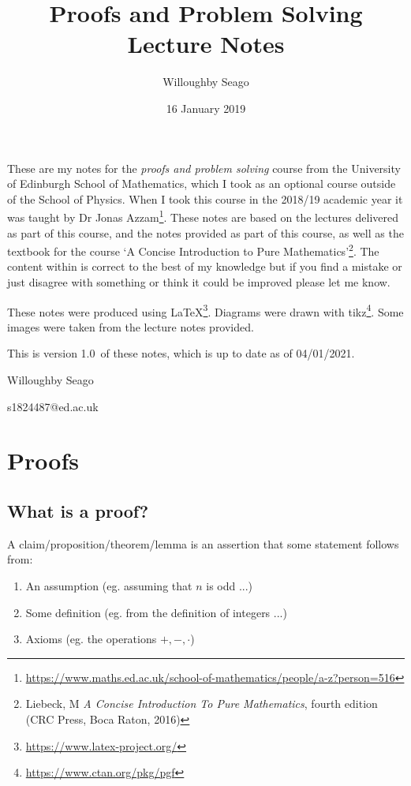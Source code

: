 \documentclass{article}
\title{Proofs and Problem Solving Lecture Notes}
\author{Willoughby Seago}
\date{16 January 2019}
\newcommand{\notesVersion}{1.0}
\newcommand{\notesDate}{04/01/2021}
\begin{document}
\maketitle
These are my notes for the \textit{proofs and problem solving} course from the University of Edinburgh School of Mathematics, which I took as an optional course outside of the School of Physics.
When I took this course in the 2018/19 academic year it was taught by Dr Jonas Azzam\footnote{\url{https://www.maths.ed.ac.uk/school-of-mathematics/people/a-z?person=516}}.
These notes are based on the lectures delivered as part of this course, and the notes provided as part of this course, as well as the textbook for the course `A Concise Introduction to Pure Mathematics'\footnote{Liebeck, M \textit{A Concise Introduction To Pure Mathematics}, fourth edition (CRC Press, Boca Raton, 2016)}.
The content within is correct to the best of my knowledge but if you find a mistake or just disagree with something or think it could be improved please let me know.

These notes were produced using \LaTeX\footnote{\url{https://www.latex-project.org/}}.
Diagrams were drawn with tikz\footnote{\url{https://www.ctan.org/pkg/pgf}}.
Some images were taken from the lecture notes provided.

This is version \notesVersion~of these notes, which is up to date as of \notesDate.
\begin{flushright}
    Willoughby Seago
    
    s1824487@ed.ac.uk
\end{flushright}
\clearpage

\tableofcontents
\newpage
\section{Proofs}

\subsection*{What is a proof?}

A claim/proposition/theorem/lemma is an assertion that some statement follows from:

\begin{enumerate}
\item An assumption (eg. assuming that \(n\) is odd ...)
\item Some definition (eg. from the definition of integers ...)
\item Axioms (eg. the operations \(+,-,\cdot\))
\end{enumerate}
\end{document}
